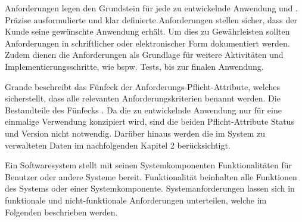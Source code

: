 Anforderungen legen den Grundstein für jede zu entwickelnde Anwendung und .
Präzise ausformulierte und klar definierte Anforderungen stellen sicher, dass der Kunde seine gewünschte Anwendung erhält. 
Um dies zu Gewährleisten sollten Anforderungen in schriftlicher oder elektronischer Form dokumentiert werden.
Zudem dienen die  Anforderungen als Grundlage für weitere Aktivitäten und Implementierungsschritte, wie bspw. Tests, bis zur finalen Anwendung.  

Grande beschreibt das Fünfeck der Anforderungs-Pflicht-Attribute, welches sicherstellt, dass alle relevanten Anforderungskriterien benannt werden. 
Die Bestandteile des Fünfecks .
Da die zu entwickelnde Anwendung nur für eine einmalige Verwendung konzipiert wird, sind die beiden Pflicht-Attribute Status und Version nicht notwendig. 
Darüber hinaus werden die im System zu verwalteten Daten im nachfolgenden Kapitel 2 berücksichtigt.

Ein Softwaresystem stellt mit seinen Systemkomponenten Funktionalitäten für Benutzer oder andere Systeme bereit. 
Funktionalität beinhalten alle Funktionen des Systems oder einer Systemkomponente.
Systemanforderungen lassen sich in funktionale und nicht-funktionale Anforderungen unterteilen, welche im Folgenden beschrieben werden.

